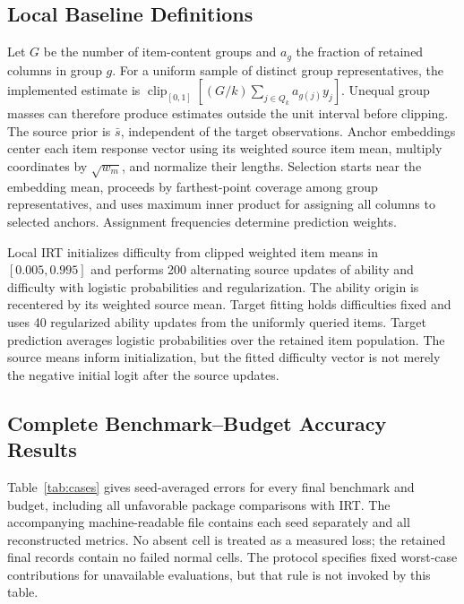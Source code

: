 \documentclass{article}
\newcommand{\clip}{\operatorname{clip}_{[0,1]}}
\begin{document}
\subsection{Local Baseline Definitions}
Let $G$ be the number of item-content groups and $a_g$ the fraction of retained columns in group $g$. For a uniform sample of distinct group representatives, the implemented estimate is $\clip[(G/k)\sum_{j\in Q_k}a_{g(j)}y_j]$. Unequal group masses can therefore produce estimates outside the unit interval before clipping. The source prior is $\bar s$, independent of the target observations. Anchor embeddings center each item response vector using its weighted source item mean, multiply coordinates by $\sqrt{w_m}$, and normalize their lengths. Selection starts near the embedding mean, proceeds by farthest-point coverage among group representatives, and uses maximum inner product for assigning all columns to selected anchors. Assignment frequencies determine prediction weights.

Local IRT initializes difficulty from clipped weighted item means in $[0.005,0.995]$ and performs 200 alternating source updates of ability and difficulty with logistic probabilities and regularization. The ability origin is recentered by its weighted source mean. Target fitting holds difficulties fixed and uses 40 regularized ability updates from the uniformly queried items. Target prediction averages logistic probabilities over the retained item population. The source means inform initialization, but the fitted difficulty vector is not merely the negative initial logit after the source updates.

\subsection{Complete Benchmark--Budget Accuracy Results}
Table~\ref{tab:cases} gives seed-averaged errors for every final benchmark and budget, including all unfavorable package comparisons with IRT. The accompanying machine-readable file contains each seed separately and all reconstructed metrics. No absent cell is treated as a measured loss; the retained final records contain no failed normal cells. The protocol specifies fixed worst-case contributions for unavailable evaluations, but that rule is not invoked by this table.
\end{document}
